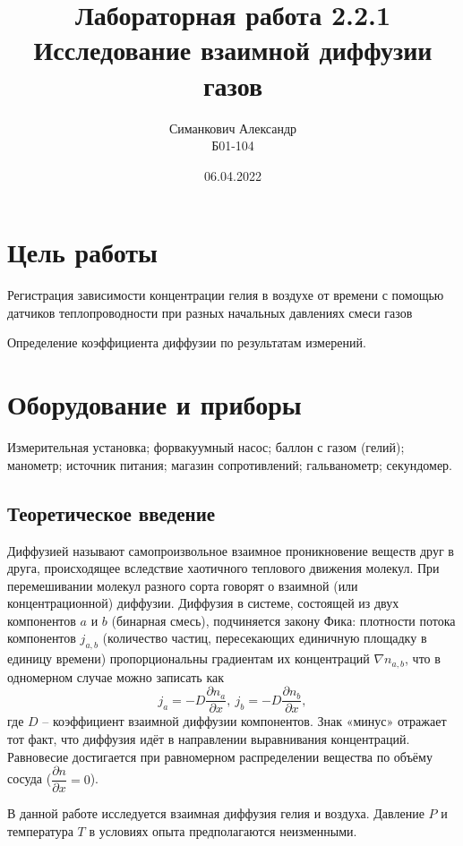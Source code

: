 \documentclass[12pt,a4paper]{article}
\title{Лабораторная работа 2.2.1\\ Исследование взаимной диффузии газов}
\author{Симанкович Александр \\ Б01-104}
\date{06.04.2022}
\begin{document}
	\maketitle
	
	\section*{Цель работы}
	Регистрация зависимости концентрации гелия в воздухе от времени с помощью датчиков теплопроводности при разных начальных давлениях смеси газов
	
	Определение коэффициента диффузии по результатам измерений.
	
	\section*{Оборудование и приборы} 
	Измерительная установка; форвакуумный насос; баллон с газом (гелий); манометр; источник питания;
	магазин сопротивлений; гальванометр; секундомер.
	
	\subsection*{Теоретическое введение}
	Диффузией называют самопроизвольное взаимное проникновение веществ друг в друга, происходящее вследствие хаотичного теплового движения молекул.
	При перемешивании молекул разного сорта говорят о взаимной (или концентрационной) диффузии.
	Диффузия в системе, состоящей из двух компонентов $a$ и $b$ (бинарная смесь), подчиняется закону Фика: плотности потока компонентов $j_{a, b}$ (количество частиц, пересекающих единичную площадку в единицу времени) пропорциональны градиентам их концентраций $\nabla n_{a, b}$, что в одномерном случае можно записать как
	\begin{equation}
		j_a = -D \dfrac{\partial n_a}{\partial x},~j_b = -D \dfrac{\partial n_b}{\partial x},
	\end{equation}
	где $D$ -- коэффициент взаимной диффузии компонентов. Знак «минус» отражает тот факт, что диффузия идёт в направлении выравнивания концентраций.
	Равновесие достигается при равномерном распределении вещества по объёму сосуда ($\dfrac{\partial n}{\partial x} = 0$).

	В данной работе исследуется взаимная диффузия гелия и воздуха. Давление $P$ и температура $T$ в условиях опыта предполагаются неизменными.
\end{document}
